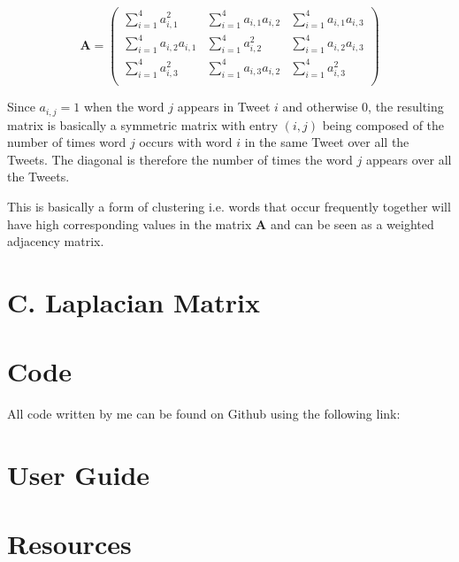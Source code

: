 \documentclass[11pt,a4paper]{article}
\newcommand{\covmat}{\mathbf{A}}
\begin{document}
\begin{equation}
\covmat =
\left( \begin{matrix}
\sum_{i=1}^4 a_{i,1}^2& \sum_{i=1}^4 a_{i,1} a_{i,2} &  \sum_{i=1}^4 a_{i,1} a_{i,3} \\ 
\sum_{i=1}^4 a_{i,2}a_{i, 1} & \sum_{i=1}^4 a_{i,2}^2 &  \sum_{i=1}^4 a_{i,2} a_{i,3} \\ 
\sum_{i=1}^4 a_{i,3}^2& \sum_{i=1}^4 a_{i,3} a_{i,2} &  \sum_{i=1}^4  a_{i,3}^2 \\ 
\end{matrix} \right)
\end{equation}

Since $a_{i, j} = 1$ when the word $j$ appears in Tweet $i$ and otherwise 0, the resulting matrix is basically a symmetric matrix with entry $(i, j)$ being composed of the number of times word $j$ occurs with word $i$ in the same Tweet over all the Tweets. The diagonal is  therefore the number of times the word $j$ appears over all the Tweets.

This is basically a form of clustering i.e. words that occur frequently together will have high corresponding values in the matrix $\covmat$ and can be seen as a weighted adjacency matrix.

\section*{C. Laplacian Matrix}

\section*{Code}
All code written by me can be found on Github using the following link:

\section{User Guide}

\section{Resources}
\end{document}
